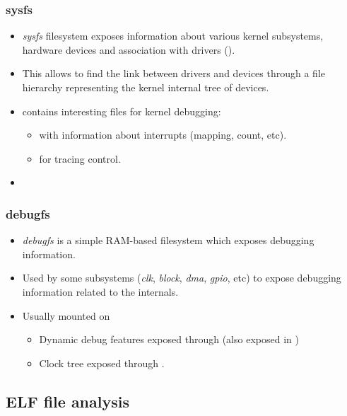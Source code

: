 \begin{frame}
  \frametitle{sysfs}
  \begin{itemize}
    \item {\em sysfs} filesystem exposes information about various kernel
          subsystems, hardware devices and association with drivers
          ().
    \item This allows to find the link between drivers and devices through a
          file hierarchy representing the kernel internal tree of devices.
    \item {} contains interesting files for kernel debugging:
    \begin{itemize}
      \item {} with information about interrupts (mapping, count, etc).
      \item {} for tracing control.
    \end{itemize}
    \item {}
  \end{itemize}
\end{frame}

\begin{frame}
  \frametitle{debugfs}
  \begin{itemize}
    \item {\em debugfs} is a simple RAM-based filesystem which exposes debugging
          information.
    \item Used by some subsystems ({\em clk}, {\em block}, {\em dma}, {\em gpio},
          etc) to expose debugging information related to the internals.
    \item Usually mounted on 
    \begin{itemize}
      \item Dynamic debug features exposed through
       (also exposed in )
      \item Clock tree exposed through .
    \end{itemize}
  \end{itemize}
\end{frame}

\subsection{ELF file analysis}

